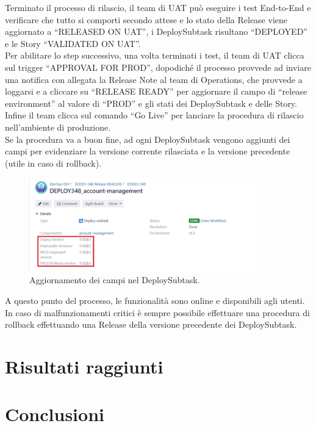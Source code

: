 \documentclass[a4paper, 12pt]{report}
\numberwithin{equation}{section}
\begin{document}
Terminato il processo di rilascio, il team di UAT può eseguire i test End-to-End e verificare che tutto si comporti secondo attese e lo stato della Release viene aggiornato a “RELEASED ON UAT”, i DeploySubtask risultano “DEPLOYED” e le Story “VALIDATED ON UAT”.\\
Per abilitare lo step successivo, una volta terminati i test, il team di UAT clicca sul trigger “APPROVAL FOR PROD”, dopodiché il processo provvede ad inviare una notifica con allegata la Release Note al team di Operations, che provvede a loggarsi e a cliccare su “RELEASE READY” per aggiornare il campo di “release environment” al valore di “PROD” e gli stati dei DeploySubtask e delle Story. Infine il team clicca sul comando “Go Live” per lanciare la procedura di rilascio nell’ambiente di produzione.\\
Se la procedura va a buon fine, ad ogni DeploySubtask vengono aggiunti dei campi per evidenziare la versione corrente rilasciata e la versione precedente (utile in caso di rollback).
\begin{figure}
    \centering
    \includegraphics[width=0.9\textwidth]{imgs/deploy-subtask.png}
    \caption{Aggiornamento dei campi nel DeploySubtask.}
    \label{fig:deploy-subtask}
\end{figure}
A questo punto del processo, le funzionalità sono online e disponibili agli utenti. In caso di malfunzionamenti critici è sempre possibile effettuare una procedura di rollback effettuando una Release della versione precedente dei DeploySubtask.


\chapter{Risultati raggiunti}

\chapter*{Conclusioni}
\end{document}
